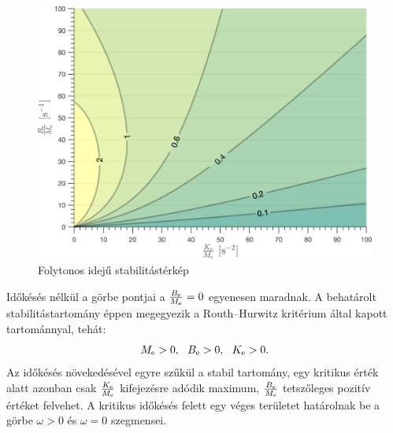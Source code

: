 \begin{figure}[H]
    \begin{center}
    \includegraphics[width=\textwidth]{images/time_delay_stab_map.png}
    \caption{Folytonos idejű stabilitástérkép}\label{fig:time_delay_stab_map}
    \end{center}
\end{figure}

Időkésés nélkül a görbe pontjai a \(\frac{B_{\mathrm{e}}}{M_{\mathrm{e}}} = 0\) egyenesen maradnak.
A behatárolt stabilitástartomány éppen megegyezik a Routh--Hurwitz kritérium által 
kapott tartománnyal, tehát:
\begin{equation}
    M_{\mathrm{e}} > 0,~~B_{\mathrm{e}} > 0,~~K_{\mathrm{e}} > 0.
\end{equation}
Az időkésés növekedésével egyre szűkül a stabil tartomány, egy kritikus érték alatt azonban
csak \(\frac{K_{\mathrm{e}}}{M_{\mathrm{e}}}\) kifejezésre adódik maximum, \(\frac{B_{\mathrm{e}}}{M_{\mathrm{e}}}\)
tetszőleges pozitív értéket felvehet. A kritikus időkésés felett egy véges területet határolnak be 
a görbe \(\omega > 0\) és \(\omega = 0\) szegmensei. 

